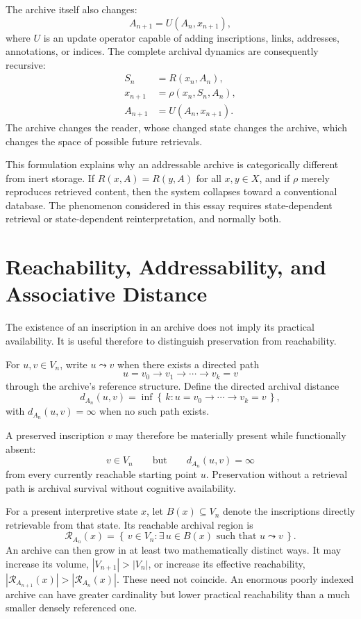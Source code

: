 \documentclass[11pt]{article}
\begin{document}
The archive itself also changes:
\[
A_{n+1} = U(A_n, x_{n+1}),
\]
where $U$ is an update operator capable of adding inscriptions, links, addresses, annotations, or indices. The complete archival dynamics are consequently recursive:
\[
\boxed{
\begin{aligned}
S_n &= R(x_n, A_n), \\
x_{n+1} &= \rho(x_n, S_n, A_n), \\
A_{n+1} &= U(A_n, x_{n+1}).
\end{aligned}}
\]
The archive changes the reader, whose changed state changes the archive, which changes the space of possible future retrievals.

This formulation explains why an addressable archive is categorically different from inert storage. If $R(x, A) = R(y, A)$ for all $x, y \in X$, and if $\rho$ merely reproduces retrieved content, then the system collapses toward a conventional database. The phenomenon considered in this essay requires state-dependent retrieval or state-dependent reinterpretation, and normally both.

\section{Reachability, Addressability, and Associative Distance}

The existence of an inscription in an archive does not imply its practical availability. It is useful therefore to distinguish preservation from reachability.

For $u, v \in V_n$, write $u \leadsto v$ when there exists a directed path
\[
u = v_0 \to v_1 \to \cdots \to v_k = v
\]
through the archive's reference structure. Define the directed archival distance
\[
d_{A_n}(u,v) = \inf\left\{\, k : u = v_0 \to \cdots \to v_k = v \,\right\},
\]
with $d_{A_n}(u,v) = \infty$ when no such path exists.

A preserved inscription $v$ may therefore be materially present while functionally absent:
\[
v \in V_n \qquad \text{but} \qquad d_{A_n}(u,v) = \infty
\]
from every currently reachable starting point $u$. Preservation without a retrieval path is archival survival without cognitive availability.

For a present interpretive state $x$, let $B(x) \subseteq V_n$ denote the inscriptions directly retrievable from that state. Its reachable archival region is
\[
\mathcal{R}_{A_n}(x) = \left\{\, v \in V_n : \exists\, u \in B(x) \text{ such that } u \leadsto v \,\right\}.
\]
An archive can then grow in at least two mathematically distinct ways. It may increase its volume, $|V_{n+1}| > |V_n|$, or increase its effective reachability, $\left|\mathcal{R}_{A_{n+1}}(x)\right| > \left|\mathcal{R}_{A_n}(x)\right|$. These need not coincide. An enormous poorly indexed archive can have greater cardinality but lower practical reachability than a much smaller densely referenced one.
\end{document}
